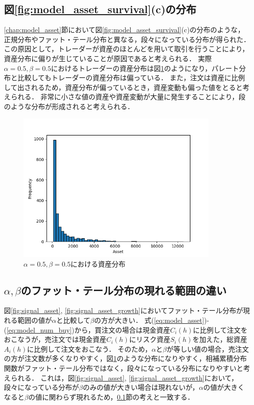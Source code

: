 \documentclass[titlepage]{jsreport}
\begin{document}
\subsection{図\ref{fig:model_asset_survival}(c)の分布}\label{chap:step}
\ref{chap:model_asset}節において図\ref{fig:model_asset_survival}(c)の分布のような，正規分布やファット・テール分布と異なる，段々になっている分布が得られた．
この原因として，トレーダーが資産のほとんどを用いて取引を行うことにより，資産分布に偏りが生じていることが原因であると考えられる．
実際$\alpha = 0.5, \beta = 0.5$におけるトレーダーの資産分布は図\ref{fig:hist_asset}のようになり，パレート分布と比較してもトレーダーの資産分布は偏っている．
また，注文は資産に比例して出されるため，資産分布が偏っているとき，資産変動も偏った値をとると考えられる．
非常に小さな値の資産や資産変動が大量に発生することにより，段のような分布が形成されると考えられる．

\begin{figure}
    \centering
    \includegraphics[width=10cm]{fig/hist.png}
    \caption{$\alpha = 0.5, \beta = 0.5$における資産分布}
    \label{fig:hist_asset}
\end{figure}


\subsection{$\alpha, \beta$のファット・テール分布の現れる範囲の違い}
図\ref{fig:signal_asset}, \ref{fig:signal_asset_growth}においてファット・テール分布が現れる範囲の値が$\alpha$と比較して$\beta$の方が大きい．
式(\ref{eq:model_asset})-(\ref{eq:model_num_buy})から，買注文の場合は現金資産$C_i(h)$に比例して注文をおこなうが，売注文では現金資産$C_i(h)$にリスク資産$S_i(h)$を加えた，総資産$A_i(h)$に比例して注文をおこなう．
そのため，$\alpha$と$\beta$が等しい値の場合，売注文の方が注文数が多くなりやすく，図\ref{fig:hist_asset}のような分布になりやすく，相補累積分布関数がファット・テール分布ではなく，段々になっている分布になりやすいと考えられる．
これは，図\ref{fig:signal_asset}, \ref{fig:signal_asset_growth}において，段々になっている分布が$\beta$のみの値が大きい場合は現れないが，$\alpha$の値が大きくなると$\beta$の値に関わらず現れるため，\ref{chap:step}節の考えと一致する．
\end{document}
